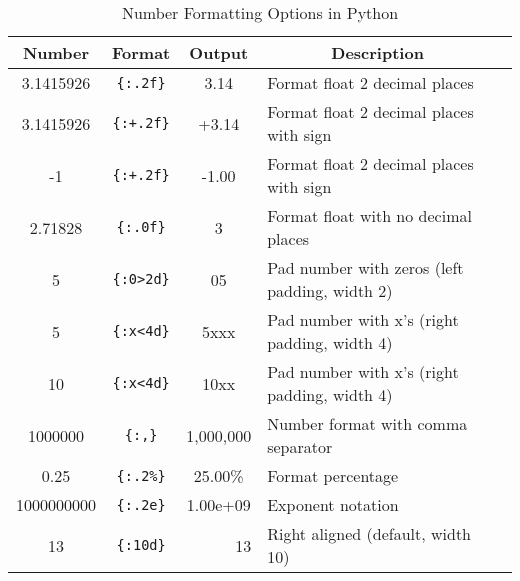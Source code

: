 \documentclass[a4paper,11pt]{book}
\numberwithin{figure}{chapter}
\numberwithin{table}{chapter}
\begin{document}
\begin{table}[!htbp]
	\centering
	\caption{Number Formatting Options in Python}
	\label{tab:number_formatting}
	\begin{tabular}{cccll}
		\toprule \toprule
		\multicolumn{1}{c}{Number} &
		\multicolumn{1}{c}{Format} & 
		\multicolumn{1}{c}{Output} & 
		\multicolumn{1}{c}{Description} \\
		\midrule
		3.1415926                           & \texttt{\{:.2f\}}                            & 3.14                                & Format float 2 decimal places                 &  \\
		3.1415926                           & \texttt{\{:+.2f\}}                           & +3.14                               & Format float 2 decimal places with sign       &  \\
		-1                                  & \texttt{\{:+.2f\}}}                           & -1.00                               & Format float 2 decimal places with sign       &  \\
		2.71828                             & \texttt{\{:.0f\}}                            & 3                                   & Format float with no decimal places           &  \\
		5                                   & \texttt{\{:0\textgreater{}2d\}}              & 05                                  & Pad number with zeros (left padding, width 2) &  \\
		5                                   & \texttt{\{:x\textless{}4d\}}                 & 5xxx                                & Pad number with x’s (right padding, width 4)  &  \\
		10                                  & \texttt{\{:x\textless{}4d\}}                 & 10xx                                & Pad number with x’s (right padding, width 4)  &  \\
		1000000                             & \texttt{\{:,\}}                              & 1,000,000                           & Number format with comma separator            &  \\
		0.25                                & \texttt{\{:.2\%\}}                           & 25.00\%                             & Format percentage                             &  \\
		1000000000                          & \texttt{\{:.2e\}}                            & 1.00e+09                            & Exponent notation                             &  \\
		13                                  & \texttt{\{:10d\}}                            & \multicolumn{1}{r}{13}                                  & Right aligned (default, width 10)             &  \\

\end{tabular}
\end{table}
\end{document}
